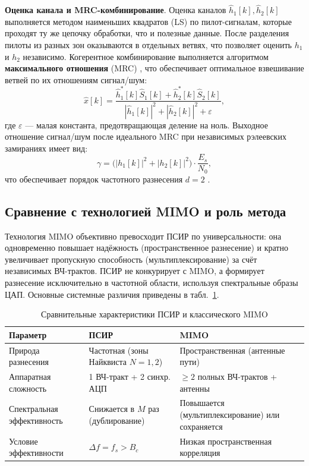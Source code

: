 \documentclass[a4paper,12pt]{article}
\numberwithin{equation}{section}
\begin{document}
\textbf{Оценка канала и MRC-комбинирование}. Оценка каналов $\hat{h}_1[k], \hat{h}_2[k]$ выполняется методом наименьших квадратов (LS) по пилот-сигналам, которые проходят ту же цепочку обработки, что и полезные данные. После разделения пилоты из разных зон оказываются в отдельных ветвях, что позволяет оценить $h_1$ и $h_2$ независимо. Когерентное комбинирование выполняется алгоритмом \textbf{максимального отношения} (MRC) \cite{proakis,goldsmith}, что обеспечивает оптимальное взвешивание ветвей по их отношениям сигнал/шум:
\begin{equation}
    \hat{x}[k] = \frac{\hat{h}_1^*[k] \hat{S}_1[k] + \hat{h}_2^*[k] \hat{S}_2[k]}{|\hat{h}_1[k]|^2 + |\hat{h}_2[k]|^2 + \varepsilon},
    \label{eq:mrc}
\end{equation}
где $\varepsilon$ --- малая константа, предотвращающая деление на ноль. Выходное отношение сигнал/шум после идеального MRC при независимых рэлеевских замираниях имеет вид:
\begin{equation}
    \gamma = \bigl( |h_1[k]|^2 + |h_2[k]|^2 \bigr) \cdot \frac{E_s}{N_0},
    \label{eq:snr_out}
\end{equation}
что обеспечивает порядок частотного разнесения $d = 2$ \cite{proakis,abdelgader}.

\subsection{Сравнение с технологией MIMO и роль метода}
\label{subsec:mimo_comparison}

Технология MIMO объективно превосходит ПСИР по универсальности: она одновременно повышает надёжность (пространственное разнесение) и кратно увеличивает пропускную способность (мультиплексирование) за счёт независимых ВЧ-трактов. ПСИР не конкурирует с MIMO, а формирует разнесение исключительно в частотной области, используя спектральные образы ЦАП. Основные системные различия приведены в табл.~\ref{tab:mimo_vs_psir}.

\begin{table}[htbp]
\centering
\small
\caption{Сравнительные характеристики ПСИР и классического MIMO}
\label{tab:mimo_vs_psir}
\begin{tabular}{@{}p{} p{} p{}@{}}
\toprule
\textbf{Параметр} & \textbf{ПСИР} & \textbf{MIMO} \\
\midrule
Природа разнесения & Частотная (зоны Найквиста $N=1,2$) & Пространственная (антенные пути) \\
Аппаратная сложность & 1 ВЧ-тракт + 2 синхр. АЦП & $\ge 2$ полных ВЧ-трактов + антенны \\
Спектральная эффективность & Снижается в $M$ раз (дублирование) & Повышается (мультиплексирование) или сохраняется \\
Условие эффективности & $\Delta f = f_s > B_c$ & Низкая пространственная корреляция \\
\bottomrule
\end{tabular}
\end{table}
\end{document}
